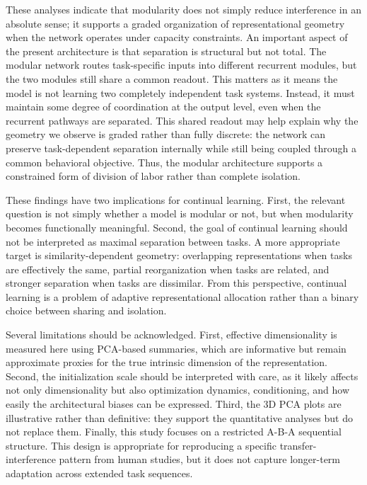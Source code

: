 \documentclass[letterpaper]{article}
\begin{document}
        These analyses indicate that modularity does not simply reduce interference in an absolute sense; it supports a graded organization of representational geometry when the network operates under capacity constraints. An important aspect of the present architecture is that separation is structural but not total. The modular network routes task-specific inputs into different recurrent modules, but the two modules still share a common readout. This matters as it means the model is not learning two completely independent task systems. Instead, it must maintain some degree of coordination at the output level, even when the recurrent pathways are separated. This shared readout may help explain why the geometry we observe is graded rather than fully discrete: the network can preserve task-dependent separation internally while still being coupled through a common behavioral objective. Thus, the modular architecture supports a constrained form of division of labor rather than complete isolation. 
        
        These findings have two implications for continual learning. First, the relevant question is not simply whether a model is modular or not, but when modularity becomes functionally meaningful. Second, the goal of continual learning should not be interpreted as maximal separation between tasks. A more appropriate target is similarity-dependent geometry: overlapping representations when tasks are effectively the same, partial reorganization when tasks are related, and stronger separation when tasks are dissimilar. From this perspective, continual learning is a problem of adaptive representational allocation rather than a binary choice between sharing and isolation.
        
        Several limitations should be acknowledged. First, effective dimensionality is measured here using PCA-based summaries, which are informative but remain approximate proxies for the true intrinsic dimension of the representation. Second, the initialization scale should be interpreted with care, as it likely affects not only dimensionality but also optimization dynamics, conditioning, and how easily the architectural biases can be expressed. Third, the 3D PCA plots are illustrative rather than definitive: they support the quantitative analyses but do not replace them. Finally, this study focuses on a restricted A-B-A sequential structure. This design is appropriate for reproducing a specific transfer-interference pattern from human studies, but it does not capture longer-term adaptation across extended task sequences.
\end{document}
